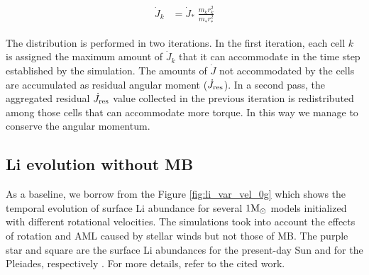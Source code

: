 \documentclass[fleqn,usenatbib]{mnras}
\begin{document}
\begin{ceqn}
\begin{align}
    \Dot{J}_{k} &= \Dot{J}_*\;\frac{m^{}_{k} r^2_{k}}{m^{}_* r_*^2} \label{eq:k_jdot}
\end{align}
\end{ceqn}

The distribution is performed in two iterations. In the first iteration, each cell $k$ is assigned the maximum amount of $\Dot{J}_{k}$ that it can accommodate in the time step established by the simulation. The amounts of $\Dot{J}$ not accommodated by the cells are accumulated as residual angular moment ($\Dot{J}_{\mathrm{res}}$). In a second pass, the aggregated residual $\Dot{J}_{\mathrm{res}}$ value collected in the previous iteration is redistributed among those cells that can accommodate more torque. In this way we manage to conserve the angular momentum.\par

\subsection{Li evolution without MB}
As a baseline, we borrow from \cite{Navarro2020} the Figure \ref{fig:li_var_vel_0g} which shows the temporal evolution of surface Li abundance for several $1\mathrm{M}_\odot$ models initialized with different rotational velocities. The simulations took into account the effects of rotation and AML caused by stellar winds but not those of MB. The purple star and square are the surface Li abundances for the present-day Sun \citep{Asplund2009} and for the Pleiades, respectively \citep{Sestito2005}. For more details, refer to the cited work.\par
\end{document}
